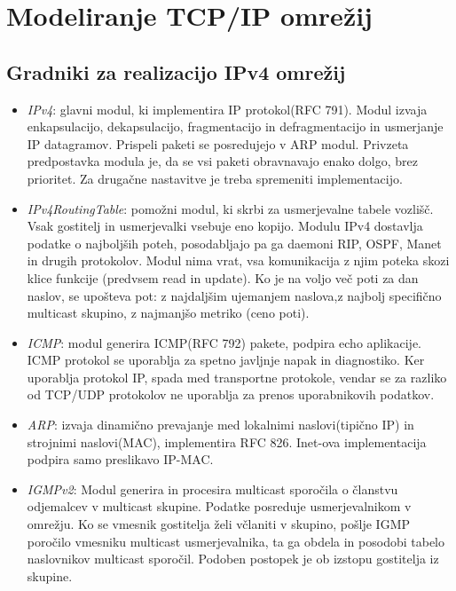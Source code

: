\documentclass[a4paper,11pt]{article}
\begin{document}
\chapter{Modeliranje TCP/IP omrežij}

\section{Gradniki za realizacijo IPv4 omrežij}
	\begin{itemize}
		\item\textit{IPv4}: glavni modul, ki implementira IP protokol(RFC 791). Modul izvaja enkapsulacijo, dekapsulacijo, fragmentacijo in defragmentacijo in usmerjanje IP datagramov. Prispeli paketi se posredujejo v ARP modul. Privzeta predpostavka modula je, da se vsi paketi obravnavajo enako dolgo, brez prioritet. Za drugačne nastavitve je treba spremeniti implementacijo.
		\item\textit{IPv4RoutingTable}: pomožni modul, ki skrbi za usmerjevalne tabele vozlišč. Vsak gostitelj in usmerjevalki vsebuje eno kopijo. Modulu IPv4 dostavlja podatke o najboljših poteh, posodabljajo pa ga daemoni RIP, OSPF, Manet in drugih protokolov. Modul nima vrat, vsa komunikacija z njim poteka skozi klice funkcije (predvsem read in update). Ko je na voljo več poti za dan naslov, se upošteva pot:
		z najdaljšim ujemanjem naslova,z najbolj specifično multicast skupino, z najmanjšo metriko (ceno poti).
		\item\textit{ICMP}: modul generira ICMP(RFC 792) pakete, podpira echo aplikacije. ICMP protokol se uporablja za spetno javljnje napak in diagnostiko. Ker uporablja protokol IP, spada med transportne protokole, vendar se za razliko od TCP/UDP protokolov ne uporablja za prenos uporabnikovih podatkov.
		\item\textit{ARP}: izvaja dinamično prevajanje med lokalnimi naslovi(tipično IP) in strojnimi naslovi(MAC), implementira RFC 826. Inet-ova implementacija podpira samo preslikavo IP-MAC.
		\item\textit{IGMPv2}: Modul generira in procesira multicast sporočila o članstvu odjemalcev v multicast skupine. Podatke posreduje usmerjevalnikom v omrežju. Ko se vmesnik gostitelja želi včlaniti v skupino, pošlje IGMP poročilo vmesniku multicast usmerjevalnika, ta ga obdela in posodobi tabelo naslovnikov multicast sporočil. Podoben postopek je ob izstopu gostitelja iz skupine. 
	\end{itemize}
\end{document}
